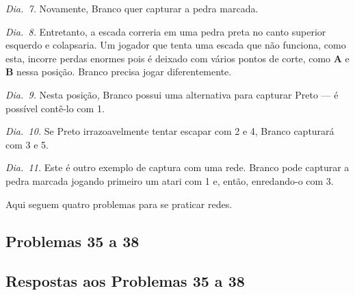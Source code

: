 \emph{Dia.\@~7.} Novamente, Branco quer capturar a pedra marcada.

\emph{Dia.\@~8.} Entretanto, a escada correria em uma pedra preta no canto superior esquerdo e colapsaria. Um jogador que tenta uma escada que não funciona, como esta, incorre perdas enormes pois é deixado com vários pontos de corte, como \textbf{A} e \textbf{B} nessa posição. Branco precisa jogar diferentemente.

\emph{Dia.\@~9.} Nesta posição, Branco possui uma alternativa para capturar Preto --- é possível contê-lo com 1.

\emph{Dia.\@~10.} Se Preto irrazoavelmente tentar escapar com 2 e 4, Branco capturará com 3 e 5.

\emph{Dia.\@~11.} Este é outro exemplo de captura com uma rede. Branco pode capturar a pedra marcada jogando primeiro um atari com 1 e, então, enredando-o com 3.

Aqui seguem quatro problemas para se praticar redes.

\subsection{Problemas 35 a 38}

\subsection{Respostas aos Problemas 35 a 38}

